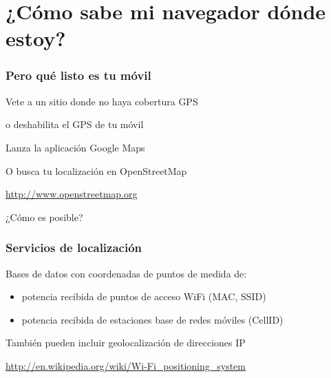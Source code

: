 %
%

\section{¿Cómo sabe mi navegador dónde estoy?}

\begin{frame}
\frametitle{Pero qué listo es tu móvil}

{\Large
Vete a un sitio donde no haya cobertura GPS

\begin{flushright}
o deshabilita el GPS de tu móvil
\end{flushright}

Lanza la aplicación Google Maps

\begin{flushright}
O busca tu localización en OpenStreetMap

\url{http://www.openstreetmap.org}
\end{flushright}
}

{\huge
\begin{center}
¿Cómo es posible?
\end{center}
}
\end{frame}

\begin{frame}
\frametitle{Servicios de localización}

{\Large
Bases de datos con coordenadas de puntos de medida de:

\begin{itemize}
\item potencia recibida de puntos de acceso WiFi (MAC, SSID)
\item potencia recibida de estaciones base de redes móviles (CellID)
\end{itemize}

También pueden incluir geolocalización de direcciones IP

\begin{flushright}
\url{http://en.wikipedia.org/wiki/Wi-Fi_positioning_system}
\end{flushright}
}

\end{frame}


